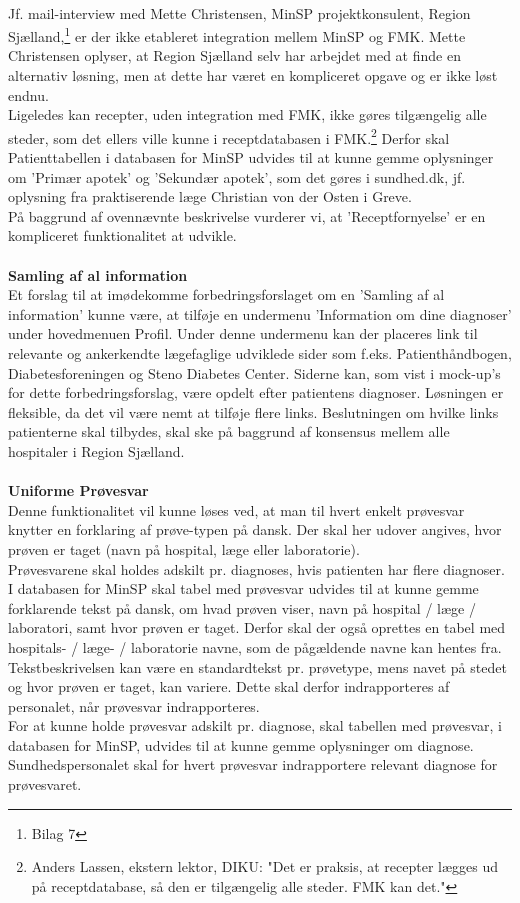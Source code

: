 \\
Jf. mail-interview med Mette Christensen, MinSP projektkonsulent, Region Sjælland,\footnote{Bilag 7} er der ikke etableret integration mellem MinSP og FMK. Mette Christensen oplyser, at Region Sjælland selv har arbejdet med at finde en alternativ løsning, men at dette har været en kompliceret opgave og er ikke løst endnu. \\
Ligeledes kan recepter, uden integration med FMK, ikke gøres tilgængelig alle steder, som det ellers ville kunne i receptdatabasen i FMK.\footnote{Anders Lassen, ekstern lektor, DIKU: "Det er praksis, at recepter lægges ud på receptdatabase, så den er tilgængelig alle steder. FMK kan det."} Derfor skal Patienttabellen i databasen for MinSP  udvides til at kunne gemme oplysninger om 'Primær apotek' og 'Sekundær apotek', som det gøres i sundhed.dk, jf. oplysning fra praktiserende læge Christian von der Osten i Greve.\\ 
På baggrund af ovennævnte beskrivelse vurderer vi, at 'Receptfornyelse' er en kompliceret funktionalitet at udvikle.
\\\\
\textbf{Samling af al information} \\
Et forslag til at imødekomme forbedringsforslaget om en 'Samling af al information' kunne være, at tilføje en undermenu 'Information om dine diagnoser' under hovedmenuen Profil. Under denne undermenu kan der placeres link til relevante og ankerkendte lægefaglige udviklede sider som f.eks. Patienthåndbogen, Diabetesforeningen og Steno Diabetes Center. Siderne kan, som vist i mock-up's for dette forbedringsforslag, være opdelt efter patientens diagnoser. Løsningen er fleksible, da det vil være nemt at tilføje flere links. Beslutningen om hvilke links patienterne skal tilbydes, skal ske på baggrund af konsensus mellem alle hospitaler i Region Sjælland. 
\\\\ 
\textbf{Uniforme Prøvesvar} \\
Denne funktionalitet vil kunne løses ved, at man til hvert enkelt prøvesvar knytter en forklaring af prøve-typen på dansk. Der skal her udover angives, hvor prøven er taget (navn på hospital, læge eller laboratorie).\\
Prøvesvarene skal holdes adskilt pr. diagnoses, hvis patienten har flere diagnoser.\\
I databasen for MinSP skal tabel med prøvesvar udvides til at kunne gemme forklarende tekst på dansk, om hvad prøven viser, navn på hospital / læge / laboratori, samt hvor prøven er taget. Derfor skal der også oprettes en tabel med hospitals- / læge- / laboratorie navne, som de pågældende navne kan hentes fra.\\ 
Tekstbeskrivelsen kan være en standardtekst pr. prøvetype, mens navet på stedet og hvor prøven er taget, kan variere. Dette skal derfor indrapporteres af personalet, når prøvesvar indrapporteres. \\
For at kunne holde prøvesvar adskilt pr. diagnose, skal tabellen med prøvesvar, i databasen for MinSP, udvides til at kunne gemme oplysninger om diagnose. Sundhedspersonalet skal for hvert prøvesvar indrapportere relevant diagnose for prøvesvaret. 
